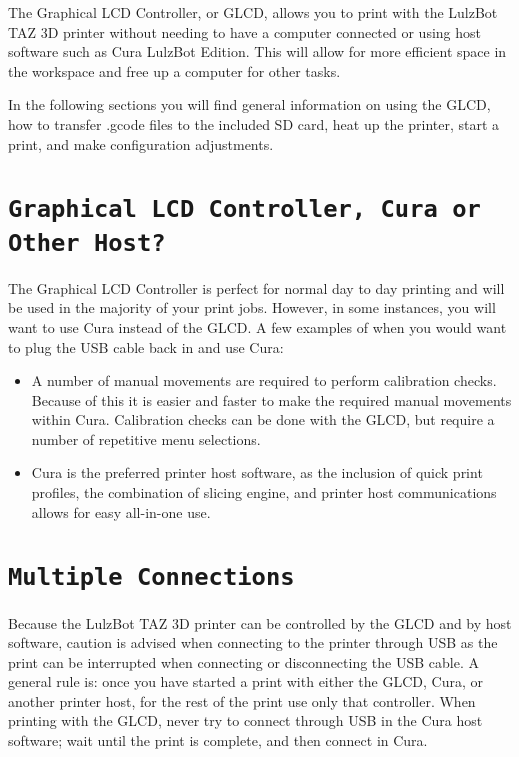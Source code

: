 %
%
%
%
%

The Graphical LCD Controller, or GLCD, allows you to print with the LulzBot TAZ 3D printer without needing to have a computer connected or using host software such as Cura LulzBot Edition. This will allow for more efficient space in the workspace and free up a computer for other tasks.

In the following sections you will find general information on using the GLCD, how to transfer .gcode files to the included SD card, heat up the printer, start a print, and make configuration adjustments.

\section{\texttt{Graphical LCD Controller, Cura or Other Host?}}
\label{sec:Graphic LCD, Cura or Other Host?}
The Graphical LCD Controller is perfect for normal day to day printing and will be used in the majority of your print jobs. However, in some instances, you will want to use Cura instead of the GLCD. A few examples of when you would want to plug the USB cable back in and use Cura:
\begin{itemize}
	\item A number of manual movements are required to perform calibration checks. Because of this it is easier and faster to make the required manual movements within Cura. Calibration checks can be done with the GLCD, but require a number of repetitive menu selections. 
	\item Cura is the preferred printer host software, as the inclusion of quick print profiles, the combination of slicing engine, and printer host communications allows for easy all-in-one use.
\end{itemize}

\section{\texttt{Multiple Connections}}
Because the LulzBot TAZ 3D printer can be controlled by the GLCD and by host software, caution is advised when connecting to the printer through USB as the print can be interrupted when connecting or disconnecting the USB cable. A general rule is: once you have started a print with either the GLCD, Cura, or another printer host, for the rest of the print use only that controller. When printing with the GLCD, never try to connect through USB in the Cura host software; wait until the print is complete, and then connect in Cura.

